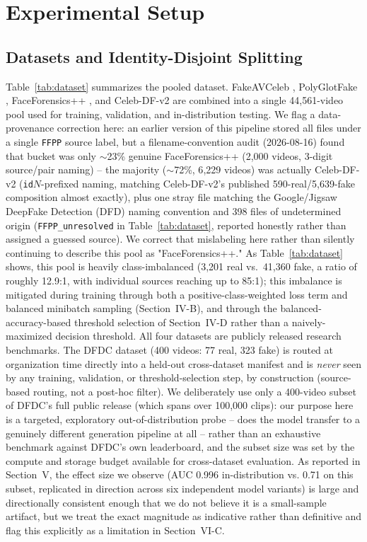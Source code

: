 \documentclass[conference]{IEEEtran}
\begin{document}
\section{Experimental Setup}

\subsection{Datasets and Identity-Disjoint Splitting}
Table~\ref{tab:dataset} summarizes the pooled dataset. FakeAVCeleb
\cite{khalid2021fakeavceleb}, PolyGlotFake \cite{polyglotfake2025},
FaceForensics++ \cite{rossler2019faceforensics}, and Celeb-DF-v2
\cite{li2020celebdf} are combined into a single 44{,}561-video pool used for
training, validation, and in-distribution testing. We flag a data-provenance
correction here: an earlier version of this pipeline stored all files under
a single \texttt{FFPP} source label, but a filename-convention audit (2026-08-16)
found that bucket was only $\sim$23\% genuine FaceForensics++ (2{,}000
videos, 3-digit source/pair naming) -- the majority ($\sim$72\%, 6{,}229
videos) was actually Celeb-DF-v2 (\texttt{id}$N$-prefixed naming, matching
Celeb-DF-v2's published 590-real/5{,}639-fake composition almost exactly),
plus one stray file matching the Google/Jigsaw DeepFake Detection (DFD)
naming convention and 398 files of undetermined origin (\texttt{FFPP\_unresolved}
in Table~\ref{tab:dataset}, reported honestly rather than assigned a guessed
source). We correct that mislabeling here rather than silently continuing to
describe this pool as "FaceForensics++." As Table~\ref{tab:dataset} shows, this pool is heavily
class-imbalanced (3{,}201 real vs.\ 41{,}360 fake, a ratio of roughly
12.9:1, with individual sources reaching up to 85:1); this imbalance is
mitigated during training through both a positive-class-weighted loss term
and balanced minibatch sampling (Section~IV-B), and through the
balanced-accuracy-based threshold selection of Section~IV-D rather than a
naively-maximized decision threshold. All four datasets are publicly
released research benchmarks. The
DFDC dataset \cite{dolhansky2020dfdc} (400 videos: 77 real, 323 fake) is
routed at organization time directly into a held-out cross-dataset manifest
and is \emph{never} seen by any training, validation, or
threshold-selection step, by construction (source-based routing, not a
post-hoc filter). We deliberately use only a 400-video subset of DFDC's
full public release (which spans over 100{,}000 clips): our purpose here is
a targeted, exploratory out-of-distribution probe -- does the model
transfer to a genuinely different generation pipeline at all -- rather than
an exhaustive benchmark against DFDC's own leaderboard, and the subset size
was set by the compute and storage budget available for cross-dataset
evaluation. As reported in Section~V, the effect size we observe (AUC 0.996
in-distribution vs. 0.71 on this subset, replicated in direction across six
independent model variants) is large and directionally consistent enough
that we do not believe it is a small-sample artifact, but we treat the
exact magnitude as indicative rather than definitive and flag this
explicitly as a limitation in Section~VI-C.
\end{document}
